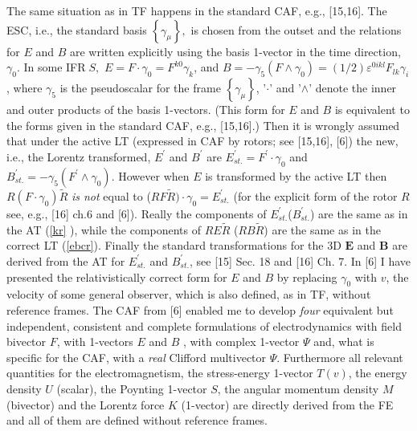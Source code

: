 \documentclass[a4paper,showpacs,preprintnumbers,amsmath,amssymb]{revtex4}
\begin{document}
The same situation as in TF happens in the standard CAF, e.g., [15,16]. The
ESC, i.e., the standard basis $\left\{ \gamma _{\mu }\right\} ,$ is chosen
from the outset and the relations for $E$ and $B$ are written explicitly
using the basis 1-vector in the time direction, $\gamma _{0}$. In some IFR$%
\;S,$ $E=F\cdot \gamma _{0}=F^{k0}\gamma _{k}$, and $B=-\gamma _{5}(F\wedge
\gamma _{0})=(1/2)\varepsilon ^{0ikl}F_{lk}\gamma _{i}$, where $\gamma _{5}$
is the pseudoscalar for the frame $\left\{ \gamma _{\mu }\right\} $, '$\cdot
$' and '$\wedge $' denote the inner and outer products of the basis
1-vectors. (This form for $E$ and $B$ is equivalent to the forms given in
the standard CAF, e.g., [15,16].) Then it is wrongly assumed that under the
active LT (expressed in CAF by rotors; see [15,16], [6]) the new, i.e., the
Lorentz transformed, $E^{\prime }$ and $B^{\prime }$ are $E_{st.}^{\prime
}=F^{\prime }\cdot \gamma _{0}$ and $B_{st.}^{\prime }=-\gamma
_{5}(F^{\prime }\wedge \gamma _{0}).$ However when $E$ is transformed by the
active LT then $R(F\cdot \gamma _{0})\widetilde{R}$ \emph{is not} equal to ($%
RF\widetilde{R})\cdot \gamma _{0}=E_{st.}^{\prime }$ (for the explicit form
of the rotor $R$ see, e.g., [16] ch.6 and [6]). Really the components of $%
E_{st.}^{\prime }$($B_{st.}^{\prime }$) are the same as in the AT (\ref{kr}%
), while the components of $RE\widetilde{R}$ ($RB\widetilde{R}$) are the
same as in the correct LT (\ref{ebcr}). Finally the standard transformations
for the 3D $\mathbf{E}$ and $\mathbf{B}$ are derived from the AT for $%
E_{st.}^{\prime }$ and $B_{st.}^{\prime }$, see [15] Sec. 18 and [16] Ch. 7.
In [6] I have presented the relativistically correct form for $E$ and $B$ by
replacing $\gamma _{0}$ with $v$, the velocity of some general observer,
which is also defined, as in TF, without reference frames. The CAF from [6]
enabled me to develop \emph{four} equivalent but independent, consistent and
complete formulations of electrodynamics with field bivector $F$, with
1-vectors $E$ and $B$ , with complex 1-vector $\Psi $ and, what is specific
for the CAF, with a \emph{real }Clifford multivector $\Psi $. Furthermore
all relevant quantities for the electromagnetism, the stress-energy 1-vector
$T(v)$, the energy density $U$ (scalar), the Poynting 1-vector $S$, the
angular momentum density $M$ (bivector) and the Lorentz force $K$ (1-vector)
are directly derived from the FE and all of them are defined without
reference frames.
\end{document}
